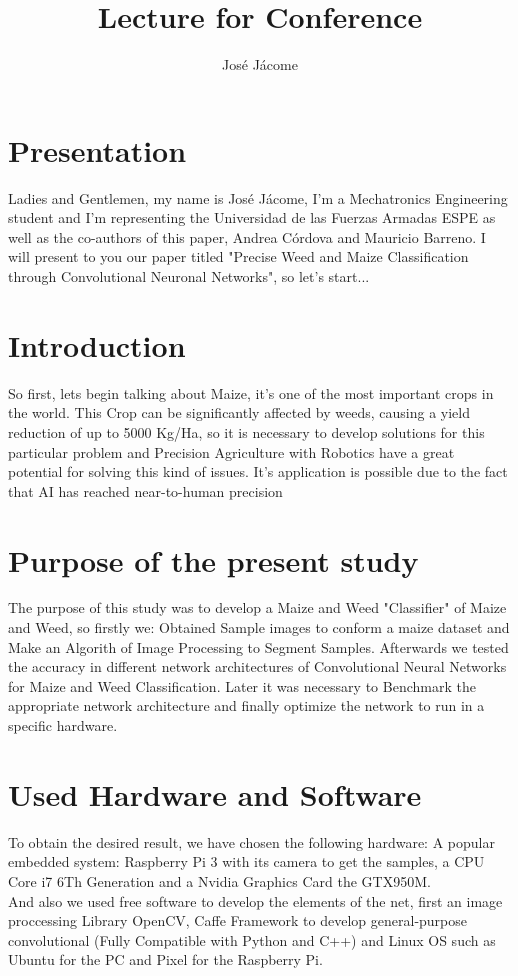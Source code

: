 \documentclass[10pt,a4paper]{proc}
\author{José Jácome}
\title{Lecture for Conference}
\begin{document}
\section{Presentation}
Ladies and Gentlemen, my name is Jos\'e J\'acome, I'm a Mechatronics Engineering student and I'm representing the Universidad de las Fuerzas Armadas ESPE as well as the co-authors of this paper, Andrea C\'ordova and Mauricio Barreno. I will present to you our paper titled "Precise Weed and Maize Classification through Convolutional Neuronal Networks", so let's start...
\section{Introduction}
So first, lets begin talking about Maize, it's one of the most important crops in the world. This Crop can be significantly affected by weeds, causing a yield reduction of up to 5000 Kg/Ha, so it is necessary to develop solutions for this particular problem and Precision Agriculture with Robotics have a great potential for solving this kind of issues. It's application is possible due to the fact that AI has reached near-to-human precision
\section{Purpose of the present study}
The purpose of this study was to develop a Maize and Weed "Classifier" of Maize and Weed, so firstly we:
Obtained Sample images to conform a maize dataset and Make an Algorith of Image Processing to Segment Samples. Afterwards we tested the accuracy in different network architectures of Convolutional Neural Networks for Maize and Weed Classification. Later it was necessary to Benchmark the appropriate network architecture  and finally optimize the network to run in a specific hardware. 
\section{Used Hardware and Software}
To obtain the desired result, we have chosen the following hardware: A popular embedded system: Raspberry Pi 3 with its camera to get the samples, a CPU Core i7 6Th Generation and a Nvidia Graphics Card the GTX950M. \\
And also we used free software to develop the elements of the net, first an image proccessing Library OpenCV, Caffe Framework to develop general-purpose convolutional (Fully Compatible with Python and C++) and Linux OS such as Ubuntu for the PC and Pixel for the Raspberry Pi.
\end{document}
